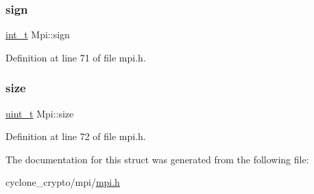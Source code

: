 \mbox{\label{structMpi_ad220415cba342d58792ae2ea00ebe34a}} 
\subsubsection{\texorpdfstring{sign}{sign}}
{\footnotesize\ttfamily \hyperlink{compiler__port_8h_a022c65af7f6c8d3947e8a37d64db6ad6}{int\+\_\+t} Mpi\+::sign}



Definition at line 71 of file mpi.\+h.

\mbox{\label{structMpi_ab7c94872ccb0b7a223c26fd3c43b0c4d}} 
\subsubsection{\texorpdfstring{size}{size}}
{\footnotesize\ttfamily \hyperlink{compiler__port_8h_a12a1e9b3ce141648783a82445d02b58d}{uint\+\_\+t} Mpi\+::size}



Definition at line 72 of file mpi.\+h.



The documentation for this struct was generated from the following file\+:\begin{DoxyCompactItemize}
\item 
cyclone\+\_\+crypto/mpi/\hyperlink{mpi_8h}{mpi.\+h}\end{DoxyCompactItemize}
